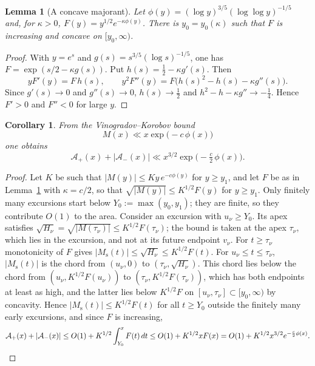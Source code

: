 \documentclass[11pt]{amsart}
\numberwithin{equation}{section}
\theoremstyle{plain}
\newtheorem{lemma}[theorem]{Lemma}
\newtheorem{corollary}[theorem]{Corollary}
\theoremstyle{definition}
\theoremstyle{remark}
\newcommand{\Ms}{M_{\mathrm{s}}}
\newcommand{\Ap}{\mathcal{A}_{+}}
\newcommand{\Am}{\mathcal{A}_{-}}
\begin{document}
\begin{lemma}[A concave majorant]
\label{lem:concave-majorant}
Let $\phi(y)=(\log y)^{3/5}(\log\log y)^{-1/5}$ and, for $\kappa>0$,
$F(y)=y^{1/2}e^{-\kappa\phi(y)}$. There is $y_0=y_0(\kappa)$ such that $F$
is increasing and concave on $[y_0,\infty)$.
\end{lemma}

\begin{proof}
With $y=e^s$ and $g(s)=s^{3/5}(\log s)^{-1/5}$, one has
$F=\exp(s/2-\kappa g(s))$. Put $h(s)=\frac12-\kappa g'(s)$. Then
\[
yF'(y)=F\,h(s),\qquad
y^2F''(y)=F\bigl(h(s)^2-h(s)-\kappa g''(s)\bigr).
\]
Since $g'(s)\to0$ and $g''(s)\to0$, $h(s)\to\frac12$ and
$h^2-h-\kappa g''\to-\frac14$. Hence $F'>0$ and $F''<0$ for large $y$.
\end{proof}

\begin{corollary}
\label{cor:uncond}
From the Vinogradov--Korobov bound \cite{Walfisz1963}
\begin{equation}
\label{eq:VK_M}
  M(x)\ll x\exp\bigl(-c\,\phi(x)\bigr)
\end{equation}
one obtains
\begin{equation}
\label{eq:uncond_area}
  \Ap(x)+|\Am(x)|\ll x^{3/2}\exp\bigl(-\tfrac c2\,\phi(x)\bigr).
\end{equation}
\end{corollary}

\begin{proof}
Let $K$ be such that $|M(y)|\le Ky\,e^{-c\phi(y)}$ for $y\ge y_1$, and let
$F$ be as in Lemma~\ref{lem:concave-majorant} with $\kappa=c/2$, so that
$\sqrt{|M(y)|}\le K^{1/2}F(y)$ for $y\ge y_1$. Only finitely many excursions
start below $Y_0:=\max(y_0,y_1)$; they are finite, so they contribute
$O(1)$ to the area. Consider an excursion with $u_\nu\ge Y_0$. Its apex
satisfies $\sqrt{H_\nu}=\sqrt{|M(\tau_\nu)|}\le K^{1/2}F(\tau_\nu)$; the
bound is taken at the apex $\tau_\nu$, which lies in the excursion, and not
at its future endpoint $v_\nu$. For $t\ge\tau_\nu$ monotonicity of $F$ gives
$|\Ms(t)|\le\sqrt{H_\nu}\le K^{1/2}F(t)$. For $u_\nu\le t\le\tau_\nu$,
$|\Ms(t)|$ is the chord from $(u_\nu,0)$ to $(\tau_\nu,\sqrt{H_\nu})$. This
chord lies below the chord from $(u_\nu,K^{1/2}F(u_\nu))$ to
$(\tau_\nu,K^{1/2}F(\tau_\nu))$, which has both endpoints at least as high,
and the latter lies below $K^{1/2}F$ on $[u_\nu,\tau_\nu]\subset[y_0,\infty)$
by concavity. Hence $|\Ms(t)|\le K^{1/2}F(t)$ for all $t\ge Y_0$ outside the
finitely many early excursions, and since $F$ is increasing,
\[
\Ap(x)+|\Am(x)|\le O(1)+K^{1/2}\int_{Y_0}^xF(t)\,dt
\le O(1)+K^{1/2}xF(x)=O(1)+K^{1/2}x^{3/2}e^{-\frac c2\phi(x)}.
\qedhere
\]
\end{proof}
\end{document}

